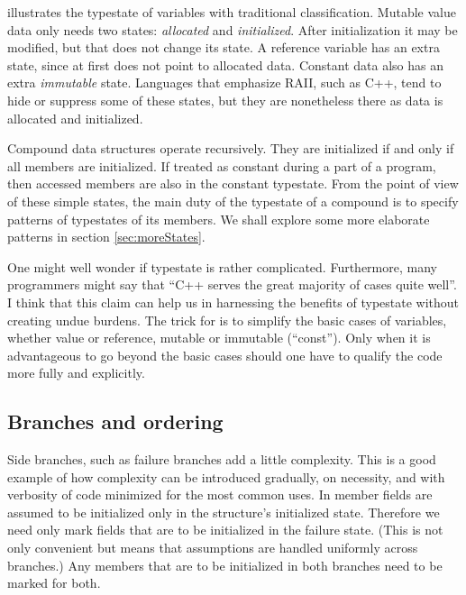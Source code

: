 \documentclass[10pt]{amsart}
\begin{document}
 illustrates the typestate of variables with
traditional classification.  Mutable value data only needs two states:
\emph{allocated} and \emph{initialized}.  After initialization it may
be modified, but that does not change its state.  A reference variable
has an extra state, since at first does not point to allocated data.
Constant data also has an extra \emph{immutable} state.  Languages
that emphasize RAII, such as C++, tend to hide or suppress some of
these states, but they are nonetheless there as data is allocated and
initialized.

Compound data structures operate recursively.  They are initialized if
and only if all members are initialized.  If treated as constant
during a part of a program, then accessed members are also in the
constant typestate.  From the point of view of these simple states,
the main duty of the typestate of a compound is to specify patterns of
typestates of its members.  We shall explore some more elaborate
patterns in section \ref{sec:moreStates}.

One might well wonder if typestate is rather complicated.
Furthermore, many programmers might say that ``C++ serves the great
majority of cases quite well''.  I think that this claim can help us
in harnessing the benefits of typestate without creating undue
burdens.  The trick for \Utop is to simplify the basic cases of
variables, whether value or reference, mutable or immutable
(``const'').  Only when it is advantageous to go beyond the basic
cases should one have to qualify the code more fully and explicitly.

\subsection{Branches and ordering}

Side branches, such as failure branches 
add a little complexity.  This is a good example of how complexity can
be introduced gradually, on necessity, and with verbosity of code
minimized for the most common uses.  In \Utop member fields are
assumed to be initialized only in the structure's initialized state.
Therefore we need only mark fields that are to be initialized in the
failure state.  (This is not only convenient but means that
assumptions are handled uniformly across branches.)  Any members that
are to be initialized in both branches need to be marked for both.
\end{document}
